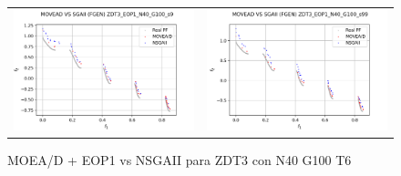 \begin{figure}[H]
\begin{tabular}{c c}
    \includegraphics[scale=0.5]{figures/ZDT3_EOP1_N40_G100_T6/s9_comp.png} &
    \includegraphics[scale=0.5]{figures/ZDT3_EOP1_N40_G100_T6/s99_comp.png}\\
    \end{tabular}
    \caption{\centering MOEA/D + EOP1 vs NSGAII para ZDT3 con N40 G100 T6}
    \label{fig:13}
\end{figure}

